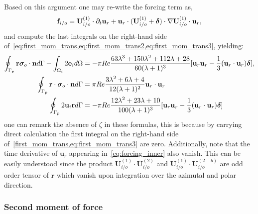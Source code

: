 Based on this argument one may re-write the forcing term as,
\begin{equation}
    \textbf{f}_{i/o}
    =\textbf{U}_{i/o}^{(1)} \cdot \pddt \textbf{u}_r 
    + \textbf{u}_r \cdot
    (\textbf{U}_{i/o}^{(1)} +\bm\delta)\cdot \grad \textbf{U}_{i/o}^{(1)}\cdot \textbf{u}_r,
    \label{eq:forcing_inner}
\end{equation}
and compute the last integrals on the right-hand side of~\ref{eq:first_mom_trans,eq:first_mom_trans2,eq:first_mom_trans3}, yielding: 
\begin{align}
    \label{eq:first_mom_trans_res}
    \intS[p]{\textbf{r}\bm\sigma_{o}\cdot \textbf{n}}
    - \intO[i]{2\textbf{e}_i}
    &=
    -\pi Re  \frac{63 \lambda^{3} + 150 \lambda^{2} + 112 \lambda + 28}{60 (\lambda+1)^{3}} [\textbf{u}_r \textbf{u}_r - \frac{1}{3}(\textbf{u}_r\cdot \textbf{u}_r ) \bm\delta]
,\\
    \label{eq:first_mom_trans_res2}
    \intS[p]{\textbf{r} \cdot  \bm\sigma_{o}\cdot \textbf{n}}
    &=
    \pi Re  \frac{3 \lambda^{2} + 6 \lambda + 4}{12 (\lambda+1)^2} \textbf{u}_r\cdot \textbf{u}_r 
     \\
    \label{eq:first_mom_trans_res3}
    \intS[p]{2\textbf{u}_{i} \textbf{r}}
    &=
    -\pi Re \frac{12\lambda^2+23\lambda +10}{100(\lambda+1)^3}[\textbf{u}_r\textbf{u}_r-\frac{1}{3} (\textbf{u}_r\cdot \textbf{u}_r )\bm\delta]
\end{align}
one can remark the absence of $\zeta$ in these formulas, this is because by carrying direct calculation the first integral on the right-hand side of~\ref{first_mom_trans,eq:first_mom_trans3} are zero. 
Additionally, note that the time derivative of $\textbf{u}_r$ appearing in~\ref{eq:forcing_inner} also vanish.
This can be easily understood since the product $\textbf{U}_{i/o}^{(1)}\cdot \textbf{U}_{i/o}^{(2)}$ and $\textbf{U}_{i/o}^{(1)}\cdot \textbf{U}_{i/o}^{(2-b)}$ are odd order tensor of $\textbf{r}$ which vanish upon integration over the azimutal and polar direction. 


\subsubsection{Second moment of force}

